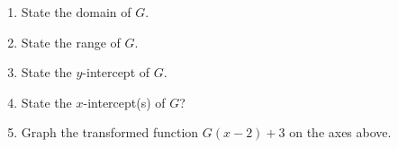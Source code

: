\documentclass[12pt]{article}
\renewcommand{\emph}[1]{\textsf{\textbf{#1}}}
\newcounter{probcount}
\newcounter{subprobcount}
\newenvironment{subproblems}{%
\begin{enumerate}%
\setcounter{enumi}{\value{subprobcount}}%
\renewcommand{\theenumi}{\emph{\alph{enumi}}}}%
{\setcounter{subprobcount}{\value{enumi}}\end{enumerate}}
\begin{document}
\begin{subproblems}
\item State the domain of $G$. \hfill \underline{\hspace{2in}} \\
  \vfill
\item State the range of $G$. \hfill \underline{\hspace{2in}} \\
  \vfill
\item State the $y$-intercept of $G$. \hfill \underline{\hspace{2in}} \\
  \vfill
\item State the $x$-intercept(s) of $G$? \hfill \underline{\hspace{2in}} \\
  \vfill
\item Graph the transformed function $G(x-2)+3$ on the axes above. \\
  \vfill
\end{subproblems}
\end{document}
